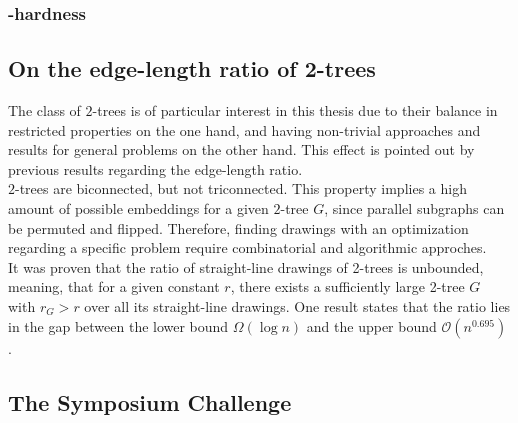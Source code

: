 
\subsubsection{\NP-hardness}


\subsection{On the edge-length ratio of 2-trees}

The class of $2$-trees is of particular interest in this thesis due to their balance in restricted properties on the one hand, and having non-trivial approaches and results for general problems on the other hand. This effect is pointed out by previous results regarding the edge-length ratio.\\
$2$-trees are biconnected, but not triconnected. This property implies a high amount of possible embeddings for a given $2$-tree $G$, since parallel subgraphs can be permuted and flipped. Therefore, finding drawings with an optimization regarding a specific problem require combinatorial and algorithmic approches.\\
It was proven that the ratio of straight-line drawings of 2-trees is unbounded, meaning, that for a given constant $r$, there exists a sufficiently large 2-tree $G$ with $r_G > r$ over all its straight-line drawings. One result states that the ratio lies in the gap between the lower bound $\Omega(\log n)$ and the upper bound $\mathcal{O}(n^{0.695})$ \cite[P. 2]{edge-length-ratio-2tree}.


\subsection{The Symposium Challenge}


